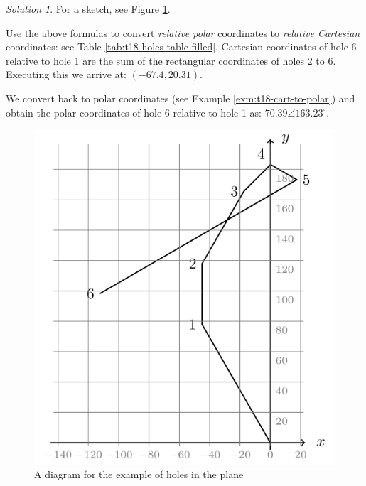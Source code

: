 \documentclass[
  12pt,
  oneside]{book}
\theoremstyle{definition}
\theoremstyle{definition}
\theoremstyle{definition}
\theoremstyle{definition}
\theoremstyle{remark}
\newtheorem*{solution}{Solution}
\begin{document}
\begin{solution}
For a sketch, see Figure \ref{fig:t18-holes-sketch}.

Use the above formulas to convert \emph{relative polar} coordinates to \emph{relative Cartesian} coordinates: see Table \ref{tab:t18-holes-table-filled}. Cartesian coordinates of hole 6 relative to hole 1 are the sum of the rectangular coordinates of holes 2 to 6. Executing this we arrive at: \((-67.4,20.31)\).

We convert back to polar coordinates (see Example \ref{exm:t18-cart-to-polar}) and obtain the polar coordinates of hole 6 relative to hole 1 as: \(70.39\angle 163.23^\circ\).
\end{solution}

\begin{figure}

{\centering \includegraphics{t18-polar-pics-3} 

}

\caption{A diagram for the example of holes in the plane}\label{fig:t18-holes-sketch}
\end{figure}
\end{document}
